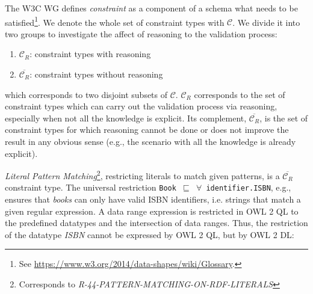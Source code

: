 \documentclass{llncs}
\newcommand{\ms}[1]{\texttt{#1}}
\newcommand{\tb}[1]{\todo[size=\small, color=green!40]{\textbf{Thomas:} #1}}
\newcommand{\er}[1]{\todo[size=\small, color=red!40]{\textbf{Erman:} #1}}
\begin{document}

The W3C WG defines \emph{constraint} as a component of a schema what needs to be satisfied\footnote{See \url{https://www.w3.org/2014/data-shapes/wiki/Glossary}.}. 
We denote the whole set of constraint types with $\mathcal{C}$. We divide it into two groups   to investigate the affect of reasoning to the validation process:
\begin{enumerate}
	\item $\mathcal{C}_R$: constraint types with reasoning
	\item $\overline{\mathcal{C}_{R}}$: constraint types without reasoning %
\end{enumerate}
 which corresponds to two disjoint subsets of $\mathcal{C}$. $\mathcal{C}_R$ corresponds to the set of constraint types which can carry out the validation process via reasoning, especially when not all the knowledge is explicit.  
Its complement, $\overline{\mathcal{C}_R}$, is the set of constraint types for which reasoning cannot be done or does not improve the result in any obvious sense (e.g., the scenario with all the knowledge is already explicit).

{\em Literal Pattern Matching}\footnote{Corresponds to {\em R-44-PATTERN-MATCHING-ON-RDF-LITERALS}}, restricting literals to match given patterns,
is a $\overline{\mathcal{C}_R}$ constraint type.
The universal restriction \ms{Book $\sqsubseteq$ $\forall$ identifier.ISBN}, e.g., ensures that \emph{books} can only have valid ISBN identifiers, 
i.e. strings that match a given regular expression. 
A data range expression is restricted in OWL 2 QL to the predefined datatypes and the intersection of data ranges. 
Thus, the restriction of the datatype {\em ISBN} cannot be expressed by OWL 2 QL, but by OWL 2 DL: %
\end{document}
